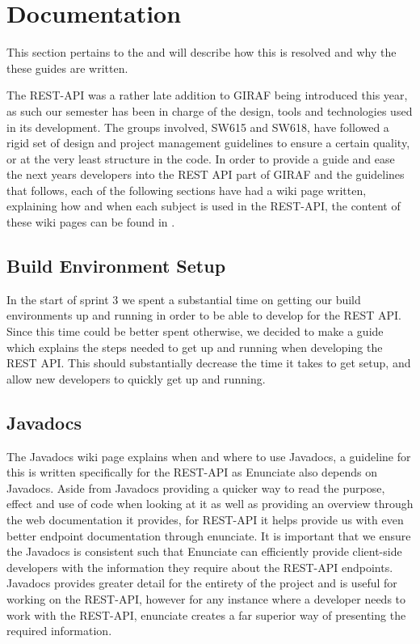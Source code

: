\section{Documentation}
This section pertains to the  and will describe how this is resolved and why the these guides are written.

The REST-API was a rather late addition to GIRAF being introduced this year, as such our semester has been in charge of the design, tools and technologies used in its development.
The groups involved, SW615 and SW618, have followed a rigid set of design and project management guidelines to ensure a certain quality, or at the very least structure in the code.
In order to provide a guide and ease the next years developers into the REST API part of GIRAF and the guidelines that follows, each of the following sections have had a wiki page written, explaining how and when each subject is used in the REST-API, the content of these wiki pages can be found in .

\subsection{Build Environment Setup}
In the start of sprint 3 we spent a substantial time on getting our build environments up and running in order to be able to develop for the REST API.
Since this time could be better spent otherwise, we decided to make a guide which explains the steps needed to get up and running when developing the REST API.
This should substantially decrease the time it takes to get setup, and allow new developers to quickly get up and running.

\subsection{Javadocs}
The Javadocs wiki page explains when and where to use Javadocs, a guideline for this is written specifically for the REST-API as Enunciate also depends on Javadocs.
Aside from Javadocs providing a quicker way to read the purpose, effect and use of code when looking at it as well as providing an overview through the web documentation it provides, for REST-API it helps provide us with even better endpoint documentation through enunciate.
It is important that we ensure the Javadocs is consistent such that Enunciate can efficiently provide client-side developers with the information they require about the REST-API endpoints.
Javadocs provides greater detail for the entirety of the project and is useful for working on the REST-API, however for any instance where a developer needs to work with the REST-API, enunciate creates a far superior way of presenting the required information.

